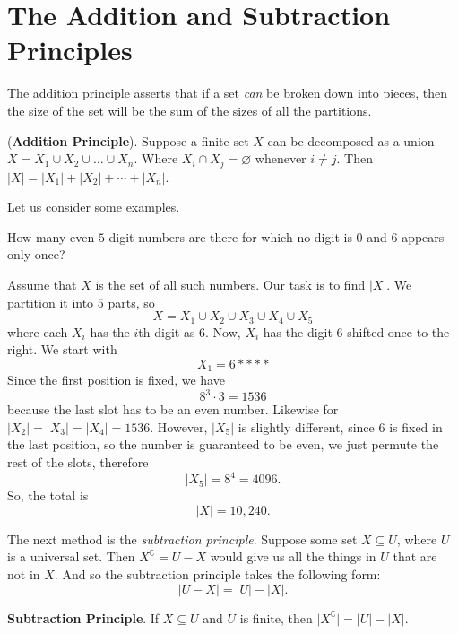 \section{The Addition and Subtraction Principles}

The addition principle asserts that if a set \emph{can} be broken down into pieces, then the size of the set will be the sum of the sizes of all the partitions. 
\begin{fact}
    (\textbf{Addition Principle}). Suppose a finite set $X$ can be decomposed as a union $X=X_{1}\cup X_{2}\cup\dots\cup X_{n}$. Where $X_{i}\cap X_{j}=\varnothing$ whenever $i\ne j$. Then $\lvert X \rvert=\lvert X_{1} \rvert+\lvert X_{2} \rvert + \cdots +\lvert X_{n} \rvert$.
\end{fact}
Let us consider some examples. 
\begin{example}
    How many even $5$ digit numbers are there for which no digit is $0$ and $6$ appears only once? 
    \begin{solution}
        Assume that $X$ is the set of all such numbers. Our task is to find $\lvert X \rvert$. We partition it into $5$ parts, so 
        $$
        X=X_{1}\cup X_{2}\cup X_{3}\cup X_{4}\cup X_{5}
        $$
        where each $X_{i}$ has the $i$th digit as $6$. 
        Now, $X_{i}$ has the digit $6$ shifted once to the right. We start with 
        $$
        X_{1}=6****
        $$
        Since the first position is fixed, we have 
        $$
        8^{3}\cdot 3=1536
        $$
        because the last slot has to be an even number. Likewise for $\lvert X_2 \rvert=\lvert X_3 \rvert=\lvert X_4 \rvert=1536$. However, $\lvert X_5 \rvert$ is slightly different, since $6$ is fixed in the last position, so the number is guaranteed to be even, we just permute the rest of the slots, therefore 
        $$
        \lvert X_{5} \rvert=8^{4}=4096.
        $$
        So, the total is 
        $$
        \lvert X \rvert=10,240.
        $$
    \end{solution}
\end{example}

The next method is the \emph{subtraction principle}. Suppose some set $X\subseteq U$, where $U$ is a universal set. Then $X^{\complement}=U-X$ would give us all the things in $U$ that are not in $X$. And so the subtraction principle takes the following form: 
$$
\lvert U-X \rvert=\lvert U \rvert-\lvert X \rvert.
$$
\begin{fact}
    \textbf{Subtraction Principle}. If $X\subseteq U$ and $U$ is finite, then $\lvert X^{\complement} \rvert=\lvert U \rvert-\lvert X \rvert$. 
\end{fact}

